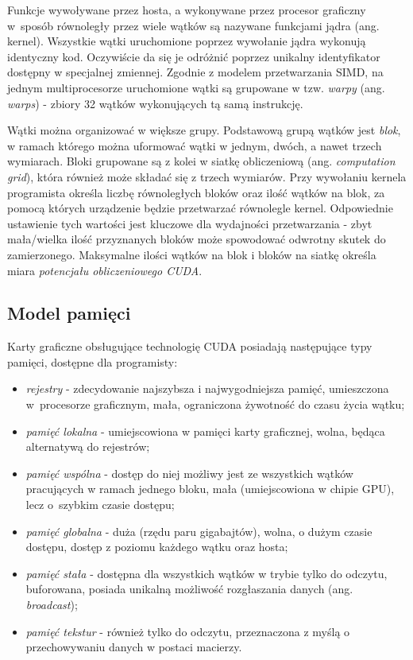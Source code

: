 \documentclass[12pt]{article}
\begin{document}
Funkcje wywoływane przez hosta, a wykonywane przez procesor graficzny w~sposób równoległy przez wiele wątków są nazywane funkcjami jądra (ang. kernel). Wszystkie wątki uruchomione poprzez wywołanie jądra wykonują identyczny kod. Oczywiście da się je odróżnić poprzez unikalny identyfikator dostępny w specjalnej zmiennej. Zgodnie z modelem przetwarzania SIMD, na jednym multiprocesorze uruchomione wątki są grupowane w tzw. \textit{warpy} (ang. \textit{warps}) - zbiory 32 wątków wykonujących tą samą instrukcję. 

Wątki można organizować w większe grupy. Podstawową grupą wątków jest \textit{blok}, w ramach którego można uformować wątki w jednym, dwóch, a nawet trzech wymiarach. Bloki grupowane są z kolei w siatkę obliczeniową (ang. \textit{computation grid}), która również może składać się z trzech wymiarów. Przy wywołaniu kernela programista określa liczbę równoległych bloków oraz ilość wątków na blok, za pomocą których urządzenie będzie przetwarzać równolegle kernel. Odpowiednie ustawienie tych wartości jest kluczowe dla wydajności przetwarzania - zbyt mała/wielka ilość przyznanych bloków może spowodować odwrotny skutek do zamierzonego. Maksymalne ilości wątków na blok i bloków na siatkę określa miara \textit{potencjału obliczeniowego CUDA}. 

\subsection{Model pamięci}

Karty graficzne obsługujące technologię CUDA posiadają następujące typy pamięci, dostępne dla programisty:

\begin{itemize}
\item \textit{rejestry} - zdecydowanie najszybsza i najwygodniejsza pamięć, umieszczona w~procesorze graficznym, mała, ograniczona żywotność do czasu życia wątku;
\item \textit{pamięć lokalna} - umiejscowiona w pamięci karty graficznej, wolna, będąca alternatywą do rejestrów;
\item \textit{pamięć wspólna} - dostęp do niej możliwy jest ze wszystkich wątków pracujących w ramach jednego bloku, mała (umiejscowiona w chipie GPU), lecz o~szybkim czasie dostępu;
\item \textit{pamięć globalna} - duża (rzędu paru gigabajtów), wolna, o dużym czasie dostępu, dostęp z poziomu każdego wątku oraz hosta;
\item \textit{pamięć stała} - dostępna dla wszystkich wątków w trybie tylko do odczytu, buforowana, posiada unikalną możliwość rozgłaszania danych (ang. \textit{broadcast});
\item \textit{pamięć tekstur} - również tylko do odczytu, przeznaczona z myślą o przechowywaniu danych w postaci macierzy.
\end{itemize}
\end{document}
